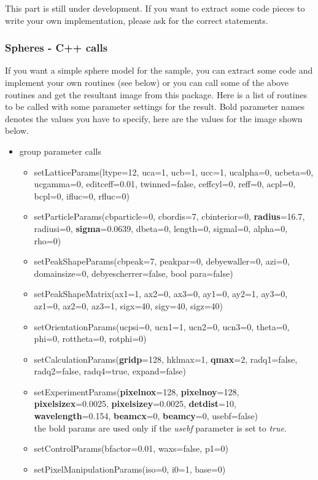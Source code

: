 \documentclass[11pt]{article} %
\begin{document}
This part is still under development. If you want to extract some code pieces to write your own implementation, please ask for the correct statements.

\subsubsection{Spheres - C++ calls}

If you want a simple sphere model for the sample, you can extract some code and implement your own routines (see below) or you can call some of the above routines and get the resultant image from this package. Here is a list of routines to be called with some parameter settings for the result. Bold parameter names denotes the values you have to specify, here are the values for the image shown below.
\begin{itemize}
\item group parameter calls
\begin{itemize}\itemsep0pt
\item setLatticeParams(ltype=12, uca=1, ucb=1, ucc=1, ucalpha=0, ucbeta=0, ucgamma=0, editceff=0.01, twinned=false, ceffcyl=0, reff=0, acpl=0, bcpl=0, ifluc=0, rfluc=0)
\item setParticleParams(cbparticle=0, cbordis=7, cbinterior=0, {\bf radius}=16.7, radiusi=0, {\bf sigma}=0.0639, dbeta=0, length=0, sigmal=0, alpha=0, rho=0)
\item setPeakShapeParams(cbpeak=7, peakpar=0, debyewaller=0, azi=0, domainsize=0, debyescherrer=false, bool para=false)
\item setPeakShapeMatrix(ax1=1, ax2=0, ax3=0, ay1=0, ay2=1, ay3=0, az1=0, az2=0, az3=1, sigx=40, sigy=40, sigz=40)
\item setOrientationParams(ucpsi=0, ucn1=1, ucn2=0, ucn3=0, theta=0, phi=0, rottheta=0, rotphi=0)
\item setCalculationParams({\bf gridp}=128, hklmax=1, {\bf qmax}=2, radq1=false, radq2=false, radq4=true, expand=false)
\item setExperimentParams({\bf pixelnox}=128, {\bf pixelnoy}=128, {\bf pixelsizex}=0.0025, {\bf pixelsizey}=0.0025, {\bf detdist}=10, {\bf wavelength}=0.154, {\bf beamcx}=0, {\bf beamcy}=0, usebf=false) \\
	the bold params are used only if the {\it usebf} parameter is set to {\it true}.
\item setControlParams(bfactor=0.01, waxs=false, p1=0)
\item setPixelManipulationParams(iso=0, i0=1, base=0)
\end{itemize} %


\end{itemize}
\end{document}
